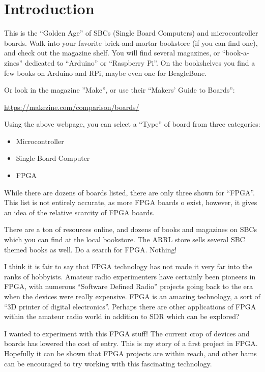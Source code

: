 \section{Introduction}

This is the ``Golden Age'' of SBCs (Single Board Computers) and microcontroller boards.
Walk into your favorite brick-and-mortar bookstore (if you can find one), 
and check out the magazine shelf.  You will find several magazines, or ``book-a-zines''
dedicated to ``Arduino'' or ``Raspberry Pi''.  On the bookshelves you find a few books on Arduino and RPi, maybe even one for BeagleBone.

Or look in the magazine ''Make'', or use their ``Makers’ Guide to Boards'':

\url{https://makezine.com/comparison/boards/}

Using the above webpage, you can select a ``Type'' of board from three categories:

\begin{itemize}
	\item Microcontroller
	\item Single Board Computer
	\item FPGA
\end{itemize}

While there are dozens of boards listed, there are only three shown for ``FPGA''.
This list is not entirely accurate, as more FPGA boards o exist, however, it gives
an idea of the relative scarcity of FPGA boards.

There are a ton of resources online, and dozens of books and magazines on SBCs which you can find at the local bookstore.
The ARRL store sells several SBC themed books as well.  Do a search for FPGA.  Nothing!

I think it is fair to say that FPGA technology has not made it very far into the ranks of hobbyists.
Amateur radio experimenters have certainly been pioneers in FPGA, with numerous ``Software Defined Radio''
projects going back to the era when the devices were really expensive.  FPGA is an amazing technology, a sort of ``3D printer of digital electronics''.  Perhaps there are other applications of FPGA within the amateur radio world in addition to SDR which can be explored?

I wanted to experiment with this FPGA stuff! The current crop of devices and boards has lowered the cost of entry.  This is my story of a first project in FPGA.  Hopefully it can be shown that FPGA projects are within reach, and other hams can be encouraged to try working with this fascinating technology.

